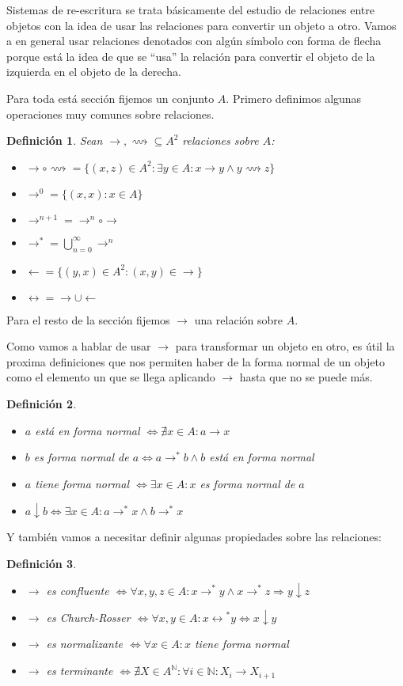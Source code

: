 \documentclass[12pt]{report}
\theoremstyle{customstyle}
\newtheorem{definition}{Definición}[chapter]
\theoremstyle{factstyle}
\begin{document}
Sistemas de re-escritura se trata básicamente del estudio de relaciones entre objetos con la idea de usar las relaciones para convertir un objeto a otro. Vamos a en general usar relaciones denotados con algún símbolo con forma de flecha porque está la idea de que se ``usa'' la relación para convertir el objeto de la izquierda en el objeto de la derecha.

Para toda está sección fijemos un conjunto $A$. Primero definimos algunas operaciones muy comunes sobre relaciones.

\begin{definition} Sean $→, ⟿ ⊆ A^2$ relaciones sobre $A$:
  \begin{itemize}
    \item $→ ∘ ⟿ = \{(x, z) ∈ A^2 : ∃y ∈ A : x → y ∧ y ⟿ z\}$
    \item $→^0 = \{(x, x) : x ∈ A\}$
    \item $→^{n + 1} = →^n ∘ →$
    \item $→^* = ⋃_{n = 0}^∞ →^n$
    \item $← = \{(y, x) ∈ A^2 : (x, y) ∈ →\}$
    \item $↔ = → ∪ ←$
  \end{itemize}
\end{definition}

Para el resto de la sección fijemos $→$ una relación sobre $A$.

Como vamos a hablar de usar $→$ para transformar un objeto en otro, es útil la proxima definiciones que nos permiten haber de la forma normal de un objeto como el elemento un que se llega aplicando $→$ hasta que no se puede más.

\begin{definition}\
  \begin{itemize}
    \item $a$ está en forma normal $⇔ ∄x ∈ A : a → x$
    \item $b$ es forma normal de $a ⇔ a →^* b ∧ b$ está en forma normal
    \item $a$ tiene forma normal $⇔ ∃x ∈ A : x$ es forma normal de $a$
    \item $a ↓ b ⇔ ∃x ∈ A : a →^* x ∧ b →^* x$
  \end{itemize}
\end{definition}

Y también vamos a necesitar definir algunas propiedades sobre las relaciones:

\begin{definition}\
  \begin{itemize}
    \item $→$ es confluente $⇔ ∀x, y, z ∈ A : x →^* y ∧ x →^*z ⇒ y ↓ z$
    \item $→$ es Church-Rosser $⇔ ∀x, y ∈ A : x ↔️^* y ⇔ x ↓ y$
    \item $→$ es normalizante $⇔ ∀x ∈ A : x$ tiene forma normal
    \item $→$ es terminante $⇔ ∄X ∈ A^ℕ : ∀i ∈ ℕ : X_i → X_{i + 1}$
  \end{itemize}
\end{definition}
\end{document}
